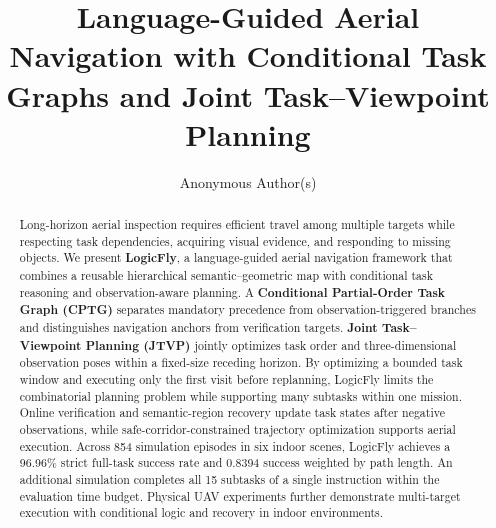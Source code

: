 \documentclass[letterpaper,10pt,journal]{IEEEtran}
\title{\LARGE\bf Language-Guided Aerial Navigation with Conditional Task Graphs and Joint Task--Viewpoint Planning}
\author{Anonymous Author(s)}
\begin{document}
\maketitle
\thispagestyle{empty}
\pagestyle{empty}
\begin{abstract}
Long-horizon aerial inspection requires efficient travel among multiple targets while respecting task dependencies, acquiring visual evidence, and responding to missing objects. We present \textbf{LogicFly}, a language-guided aerial navigation framework that combines a reusable hierarchical semantic--geometric map with conditional task reasoning and observation-aware planning. A \textbf{Conditional Partial-Order Task Graph (CPTG)} separates mandatory precedence from observation-triggered branches and distinguishes navigation anchors from verification targets. \textbf{Joint Task--Viewpoint Planning (JTVP)} jointly optimizes task order and three-dimensional observation poses within a fixed-size receding horizon. By optimizing a bounded task window and executing only the first visit before replanning, LogicFly limits the combinatorial planning problem while supporting many subtasks within one mission. Online verification and semantic-region recovery update task states after negative observations, while safe-corridor-constrained trajectory optimization supports aerial execution. Across 854 simulation episodes in six indoor scenes, LogicFly achieves a 96.96\% strict full-task success rate and 0.8394 success weighted by path length. An additional simulation completes all 15 subtasks of a single instruction within the evaluation time budget. Physical UAV experiments further demonstrate multi-target execution with conditional logic and recovery in indoor environments.
\end{abstract}
\end{document}
